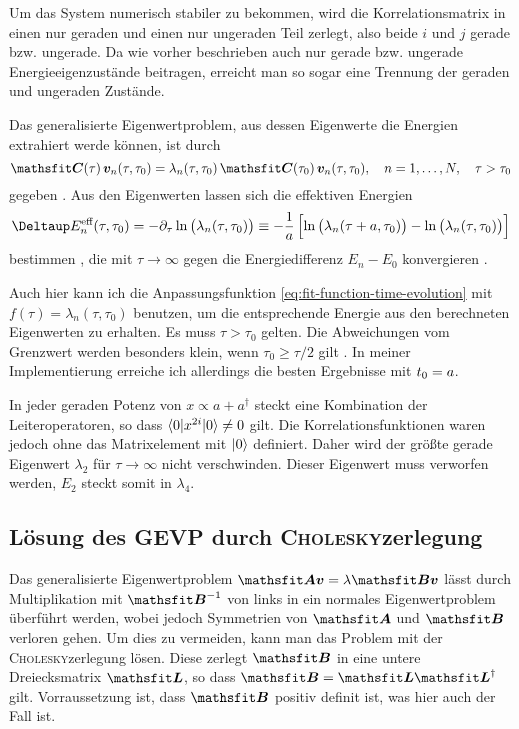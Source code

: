Um das System numerisch stabiler zu bekommen, wird die Korrelationsmatrix in
einen nur geraden und einen nur ungeraden Teil zerlegt, also beide $i$ und $j$
gerade bzw. ungerade. Da wie vorher beschrieben auch nur gerade bzw. ungerade
Energieeigenzustände beitragen, erreicht man so sogar eine Trennung der geraden
und ungeraden Zustände.

Das generalisierte Eigenwertproblem, aus dessen Eigenwerte die Energien
extrahiert werde können, ist durch
\[
    \tens C(\tau) \, \vec v_n(\tau, \tau_0) = \lambda_n(\tau, \tau_0) \, \tens
    C(\tau_0) \, \vec v_n(\tau, \tau_0)
    \eqnsep
    n = 1, \ldots, N
    \eqnsep
    \tau > \tau_0
\]
gegeben \parencite[(2.1)]{Blossier/Eigenvalue}. Aus den Eigenwerten lassen sich
die effektiven Energien
\[
    \Deltaup E_n^\text{eff}(\tau, \tau_0) = - \partial_\tau \ln\del{\lambda_n(\tau, \tau_0)} \equiv -
    \frac 1\timestep \sbr{ \ln\del{\lambda_n(\tau+\timestep, \tau_0)} -
    \ln\del{\lambda_n(\tau, \tau_0)} }
\]
bestimmen \parencite[(2.4)]{Blossier/Eigenvalue}, die mit $\tau \to \infty$
gegen die Energiedifferenz $E_n - E_0$ konvergieren
\parencite[(2.3)]{Blossier/Eigenvalue}.

Auch hier kann ich die Anpassungsfunktion
\eqref{eq:fit-function-time-evolution} mit $f(\tau) = \lambda_n(\tau, \tau_0)$
benutzen, um die entsprechende Energie aus den berechneten Eigenwerten zu
erhalten. Es muss $\tau > \tau_0$ gelten. Die Abweichungen vom Grenzwert werden
besonders klein, wenn $\tau_0 \geq \tau/2$ gilt
\parencite[5]{Blossier/Eigenvalue}. In meiner Implementierung erreiche ich
allerdings die besten Ergebnisse mit $t_0 = a$.

In jeder geraden Potenz von $x \propto a + a^\dagger$ steckt eine Kombination
der Leiteroperatoren, so dass $\braket{0 | x^{2i} | 0} \neq 0$ gilt. Die
Korrelationsfunktionen waren jedoch ohne das Matrixelement mit $\ket 0$
definiert. Daher wird der größte gerade Eigenwert $\lambda_2$ für $\tau \to
\infty$ nicht verschwinden. Dieser Eigenwert muss verworfen werden, $E_2$
steckt somit in $\lambda_4$.

\subsection{Lösung des GEVP durch \textsc{Cholesky}zerlegung}

Das generalisierte Eigenwertproblem $\tens A \vec v = \lambda \tens B \vec v$
lässt durch Multiplikation mit $\tens B^{-1}$ von links in ein normales
Eigenwertproblem überführt werden, wobei jedoch Symmetrien von $\tens A$ und
$\tens B$ verloren gehen. Um dies zu vermeiden, kann man das Problem mit der
\textsc{Cholesky}zerlegung lösen. Diese zerlegt $\tens B$ in eine untere
Dreiecksmatrix $\tens L$, so dass $\tens B = \tens L \tens L^\dagger$ gilt.
Vorraussetzung ist, dass $\tens B$ positiv definit ist, was hier auch der Fall
ist.
\parencite{MacKinnon/GEVP}

